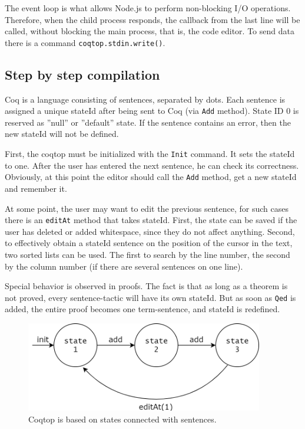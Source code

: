 The event loop is what allows Node.js to perform non-blocking I/O operations. Therefore, when the child process responds, the callback from the last line will be called, without blocking the main process, that is, the code editor. To send data there is a command \texttt{coqtop.stdin.write()}.

\newpage


\subsection{Step by step compilation}

Coq is a language consisting of sentences, separated by dots. Each sentence is assigned a unique stateId after being sent to Coq (via \texttt{Add} method). State ID 0 is reserved as ''null'' or ''default'' state. If the sentence contains an error, then the new stateId will not be defined.

First, the coqtop must be initialized with the \texttt{Init} command. It sets the stateId to one. After the user has entered the next sentence, he can check its correctness. Obviously, at this point the editor should call the  \texttt{Add} method, get a new stateId and remember it.

At some point, the user may want to edit the previous sentence, for such cases there is an \texttt{editAt} method that takes stateId. First, the state can be saved if the user has deleted or added whitespace, since they do not affect anything. Second, to effectively obtain a stateId sentence on the position of the cursor in the text, two sorted lists can be used. The first to search by the line number, the second by the column number (if there are several sentences on one line).

Special behavior is observed in proofs. The fact is that as long as a theorem is not proved, every sentence-tactic will have its own stateId. But as soon as \texttt{Qed} is added, the entire proof becomes one term-sentence, and stateId is redefined.\\
\vspace{1em}
\begin{figure}[H]
\centering
\includegraphics[width=28em]{img/dia.png}
\caption{\label{fig:dia}Coqtop is based on states connected with sentences.}
\end{figure}

